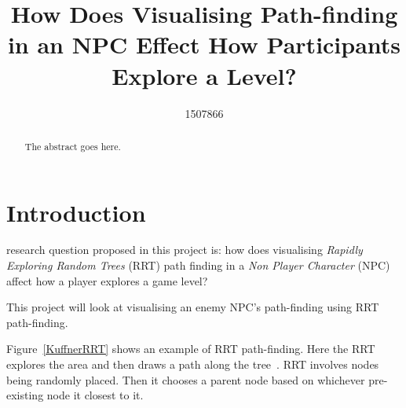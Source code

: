 \documentclass[journal]{IEEEtran}
\begin{document}
%
\title{ How Does Visualising Path-finding in an NPC Effect How Participants Explore a Level?}
%
%
\author{1507866}


\maketitle

\begin{abstract}
The abstract goes here.
\end{abstract}

\section{Introduction}
% 
% 
% 
% 
 research question proposed in this project is: how does visualising \textit{Rapidly Exploring Random Trees} (RRT) path finding in a \textit{Non Player Character} (NPC) affect how a player explores a game level?


This project will look at visualising an enemy NPC's path-finding using RRT path-finding.   

Figure~\ref{KuffnerRRT} shows an example of RRT path-finding. Here the RRT explores the area and then draws a path along the tree~\cite{Kuffner2000}.  RRT involves nodes being randomly placed. Then it chooses a parent node based on whichever pre-existing node it closest to it.
\end{document}
